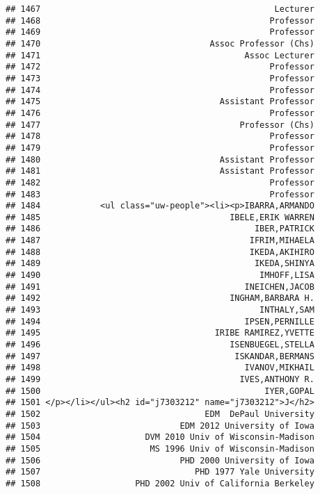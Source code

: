 \documentclass[
]{article}
\begin{document}
\begin{verbatim}
## 1467                                               Lecturer
## 1468                                              Professor
## 1469                                              Professor
## 1470                                  Assoc Professor (Chs)
## 1471                                         Assoc Lecturer
## 1472                                              Professor
## 1473                                              Professor
## 1474                                              Professor
## 1475                                    Assistant Professor
## 1476                                              Professor
## 1477                                        Professor (Chs)
## 1478                                              Professor
## 1479                                              Professor
## 1480                                    Assistant Professor
## 1481                                    Assistant Professor
## 1482                                              Professor
## 1483                                              Professor
## 1484            <ul class="uw-people"><li><p>IBARRA,ARMANDO
## 1485                                      IBELE,ERIK WARREN
## 1486                                           IBER,PATRICK
## 1487                                          IFRIM,MIHAELA
## 1488                                          IKEDA,AKIHIRO
## 1489                                           IKEDA,SHINYA
## 1490                                            IMHOFF,LISA
## 1491                                         INEICHEN,JACOB
## 1492                                      INGHAM,BARBARA H.
## 1493                                            INTHALY,SAM
## 1494                                         IPSEN,PERNILLE
## 1495                                   IRIBE RAMIREZ,YVETTE
## 1496                                      ISENBUEGEL,STELLA
## 1497                                       ISKANDAR,BERMANS
## 1498                                         IVANOV,MIKHAIL
## 1499                                        IVES,ANTHONY R.
## 1500                                             IYER,GOPAL
## 1501 </p></li></ul><h2 id="j7303212" name="j7303212">J</h2>
## 1502                                 EDM  DePaul University
## 1503                            EDM 2012 University of Iowa
## 1504                     DVM 2010 Univ of Wisconsin-Madison
## 1505                      MS 1996 Univ of Wisconsin-Madison
## 1506                            PHD 2000 University of Iowa
## 1507                               PHD 1977 Yale University
## 1508                   PHD 2002 Univ of California Berkeley

\end{verbatim}
\end{document}
